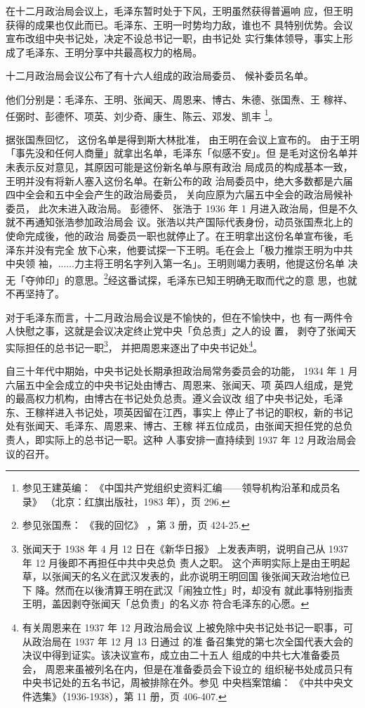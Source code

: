 在十二月政治局会议上，毛泽东暂时处于下风，王明虽然获得普遍响
应，但王明获得的成果也仅此而已。毛泽东、王明一时势均力敌，谁也不
具特别优势。会议宣布改组中央书记处，决定不设总书记一职，由书记处
实行集体领导，事实上形成了毛泽东、王明分享中共最高权力的格局。

十二月政治局会议公布了有十六人组成的政治局委员、
候补委员名单。
 

他们分别是：毛泽东、王明、张闻天、周恩来、博古、朱德、张国焘、王
稼祥、任弼时、彭德怀、项英、刘少奇、康生、陈云、邓发、凯丰
\footnote{参见王建英编：
《中国共产党组织史资料汇编——领导机构沿革和成员名录》
（北京：红旗出版社，1983 年），页 296.}。
 
据张国焘回忆，
这份名单是得到斯大林批准，
由王明在会议上宣布的。
由于王明「事先没和任何人商量」就拿出名单，毛泽东「似感不安」。但
是毛对这份名单并未表示反对意见，其原因可能是这份新名单与原有政治
局成员的构成基本一致，王明并没有将新人塞入这份名单。在新公布的政
治局委员中，绝大多数都是六届四中全会和五中全会产生的政治局委员，
关向应原为六届五中全会的政治局候补委员，
此次未进入政治局。
彭德怀、
张浩于 1936 年 1 月进入政治局，但是不久就不再通知张浩参加政治局会
议。张浩以共产国际代表身份，动员张国焘北上的使命完成後，他的政治
局委员一职也就停止了。在王明拿出这份名单宣布後，毛泽东并没有完全
放下心来，他要试探一下王明。毛在会上「极力推崇王明为中共中央领
袖，......力主将王明名字列入第一名」。王明则竭力表明，他提这份名单
决无「夺帅印」的意思。\footnote{参见张国焘：
《我的回忆》
，第 3 册，页 424-25.}经这番试探，毛泽东已知王明确无取而代之的意
思，也就不再坚持了。

对于毛泽东而言，十二月政治局会议是不愉快的，但在不愉快中，也 有一两件令
人快慰之事，这就是会议决定终止党中央「负总责」之人的设 置， 剥夺了张闻天
实际担任的总书记一职\footnote{张闻天于 1938 年 4 月 12 日在《新华日报》
上发表声明，说明自己从 1937 年 12 月後即不再担任中共中央总负 责人之职。
这个声明实际上是由王明起草，以张闻天的名义在武汉发表的，此亦说明王明回国
後张闻天政治地位已下 降。然而在以後清算王明在武汉「闹独立性」时，却没有
就此事特别指责王明，盖因剥夺张闻天「总负责」的名义亦 符合毛泽东的心愿。}，
并把周恩来逐出了中央书记处\footnote{有关周恩来在 1937 年 12 月政治局会议
上被免除中央书记处书记一职事，可从政治局在 1937 年 12 月 13 日通过 的准
备召集党的第七次全国代表大会的决议中得到证实。该决议宣布，成立由二十五人
组成的中共七大准备委员会， 周恩来虽被列名在内，但是在准备委员会下设立的
组织秘书处成员只有中央书记处的五名书记，周被排除在外。参见 中央档案馆编：
《中共中央文件选集》（1936-1938），第 11 册，页 406-407.  }。

自三十年代中期始，中央书记处长期承担政治局常务委员会的功能，
1934 年 1 月六届五中全会成立的中央书记处由博古、周恩来、张闻天、项
英四人组成，是党的最高权力机构，由博古在书记处负总责。遵义会议改
组了中央书记处，毛泽东、王稼祥进入书记处，项英因留在江西，事实上
停止了书记的职权，新的书记处有张闻天、毛泽东、周恩来、博古、王稼
祥五位成员，由张闻天担任党的总负责人，即实际上的总书记一职。这种
人事安排一直持续到 1937 年 12 月政治局会议的召开。

